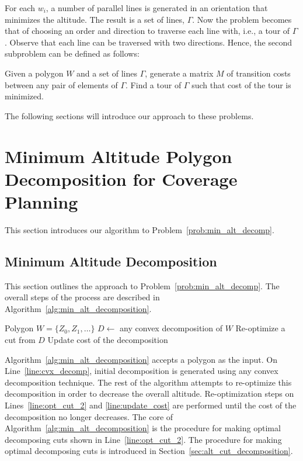 \documentclass[../main.tex]{subfiles}
\begin{document}
For each $w_i$, a number of parallel lines is generated in an orientation that minimizes the altitude. The result is a set of lines, $\Gamma$. Now the problem becomes that of choosing an order and direction to traverse each line with, i.e., a tour of $\Gamma$. Observe that each line can be traversed with two directions. Hence, the second subproblem can be defined as follows:

\begin{problem}
\label{prob:min_tour}
Given a polygon $W$ and a set of lines $\Gamma$, generate a matrix $M$ of transition costs between any pair of elements of $\Gamma$. Find a tour of $\Gamma$ such that cost of the tour is minimized.
\end{problem}%
The following sections will introduce our approach to these problems.


\section{Minimum Altitude Polygon Decomposition for Coverage Planning}
\label{section:min_alt_decomposition}

This section introduces our algorithm to Problem~\ref{prob:min_alt_decomp}.


\subsection{Minimum Altitude Decomposition}

This section outlines the approach to Problem~\ref{prob:min_alt_decomp}. The overall steps of the process are described in Algorithm~\ref{alg:min_alt_decomposition}.
\begin{algorithm}
	\caption{$\operatorname{min\_alt\_decomposition}(W)$}
	\label{alg:min_alt_decomposition}
	\begin{algorithmic}[1]
		\REQUIRE Polygon $W=\{Z_0,Z_1,\ldots\}$
			\STATE $D\gets$ any convex decomposition of $W$	\label{line:cvx_decomp}
			\REPEAT
				\STATE Re-optimize a cut from $D$ \label{line:opt_cut_2}
				\STATE Update cost of the decomposition \label{line:update_cost}
	\end{algorithmic}
\end{algorithm}

Algorithm~\ref{alg:min_alt_decomposition} accepts a polygon as the input. On Line~\ref{line:cvx_decomp}, initial decomposition is generated using any convex decomposition technique. The rest of the algorithm attempts to re-optimize this decomposition in order to decrease the overall altitude. Re-optimization steps on Lines~\ref{line:opt_cut_2} and \ref{line:update_cost} are performed until the cost of the decomposition no longer decreases. The core of Algorithm~\ref{alg:min_alt_decomposition} is the procedure for making optimal decomposing cuts shown in Line~\ref{line:opt_cut_2}. The procedure for making optimal decomposing cuts is introduced in Section~\ref{sec:alt_cut_decomposition}.
\end{document}
